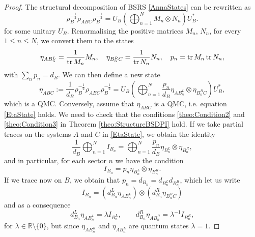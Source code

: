 \documentclass[11pt]{article}
\theoremstyle{newdefinition}
\theoremstyle{newplain}
\theoremstyle{myplain}
\DeclareMathOperator{\1}{\mathds{1}}
\begin{document}
\begin{proof}
    The structural decomposition of BSRS  \eqref{AnnaStates}  can be rewritten as 
    \begin{equation}
        \rho_B^{-\frac{1}{2}}\rho_{ABC}\rho_B^{-\frac{1}{2}}=U_B\left(  \bigoplus_{n=1}^N M_n \otimes N_n \right) U_B^*.
    \end{equation}
   for some unitary $U_B$. Renormalising the positive matrices $M_n$, $N_n$, for every $1 \leq n\leq N$,  we convert them to the states
    \begin{equation}
        \eta_{AB_n^L}=\frac{1}{\tr M_n}M_n, \quad \eta_{B_n^RC}=\frac{1}{\tr N_n}N_n, \quad p_n=\tr M_n\tr N_n, 
    \end{equation}  with $\sum_n p_n=d_B$. We can then define a new state
    \begin{equation}\label{EtaState}
          \eta_{ABC}:=\frac{1}{d_B} \rho_B^{-\frac{1}{2}}\rho_{ABC}\rho_B^{-\frac{1}{2}}=U_B \left(\bigoplus_{n=1}^N \frac{p_n}{d_B}  \eta_{AB_n^L} \otimes \eta_{B_n^RC}\right)U_B^*,
    \end{equation}
    which is a QMC.   Conversely, assume that $\eta_{ABC}$ is a QMC, i.e. equation \eqref{EtaState} holds. We need to check that the conditions \ref{theo:Condition2}  and \ref{theo:Condition3} in Theorem \ref{theo:StructureBSDPI} hold. If we take partial traces on the systems $A$ and $C$ in \eqref{EtaState}, we obtain the identity
    \begin{equation}
        \frac{1}{d_B}\bigoplus_{n=1}^N I_{B_n}=\bigoplus_{n=1}^N \frac{p_n}{d_B}  \eta_{B_n^L} \otimes \eta_{B_n^R},
    \end{equation}
and in particular, for each sector $n$ we have the condition
\begin{equation}
    I_{B_n}=p_n \eta_{B_n^L} \otimes \eta_{B_n^R}.
\end{equation}
If we trace now on $B$, we obtain that $p_n=d_{B_n}=d_{B_n^L}d_{B_n^R}$, which let us write
    \begin{equation}
        I_{B_n}=(d_{B_n}^L\eta_{AB_n^L})\otimes (d_{B_n}^R \eta_{B_n^RC})
    \end{equation}
   and as a consequence
   \begin{equation}
       d_{B_n}^L\eta_{AB_n^L}=\lambda I_{B_n^L}, \qquad  d_{B_n}^R \eta_{AB_n^R}=\lambda^{-1} I_{B_n^R},
   \end{equation}
for $\lambda \in \mathbb{R}\setminus \{0\}$, but since $\eta_{AB_n^R}$ and $\eta_{AB_n^L}$ are quantum states $\lambda=1$.
\end{proof}
\end{document}
